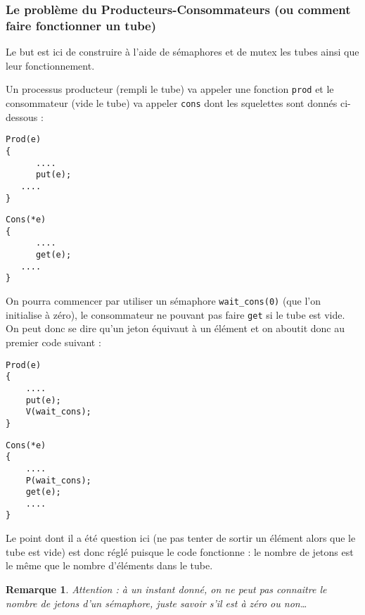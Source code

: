 \documentclass[12pt,a4paper]{report}
\newtheorem*{rem}{Remarque}
\begin{document}
\subsubsection{Le problème du Producteurs-Consommateurs (ou comment faire fonctionner un tube)}
\label{sec:prod-cons}

Le but est ici de construire à l'aide de sémaphores et de mutex les tubes ainsi que leur fonctionnement.

Un processus producteur (rempli le tube) va appeler une fonction \verb?prod? et le consommateur (vide le tube) va appeler \verb?cons? dont les squelettes sont donnés ci-dessous :

\medskip

\begin{minipage}{0.5\linewidth}
\begin{verbatim}
Prod(e)
{
      ....
      put(e);
   ....
}
\end{verbatim}
\end{minipage}
\begin{minipage}{0.5\linewidth}
\begin{verbatim}
Cons(*e)
{
      ....
      get(e);
   ....
}
\end{verbatim}
\end{minipage}

\medskip

On pourra commencer par utiliser un sémaphore \verb?wait_cons(0)? (que l'on initialise à zéro), le consommateur ne pouvant pas faire \verb?get? si le tube est vide. On peut donc se dire qu'un jeton équivaut à un élément et on aboutit donc au  premier code suivant :

\medskip

\begin{minipage}{0.5\linewidth}
\begin{verbatim}
Prod(e)
{
    ....
    put(e);
    V(wait_cons);
}
\end{verbatim}
\end{minipage}
\begin{minipage}{0.5\linewidth}
\begin{verbatim}
Cons(*e)
{
    ....
    P(wait_cons);
    get(e);
    ....
}
\end{verbatim}
\end{minipage}

\medskip

Le point dont il a été question ici (ne pas tenter de sortir un élément alors que le tube est vide) est donc réglé puisque le code fonctionne : le nombre de jetons est le même que le nombre d'éléments dans le tube.
\begin{rem}
  Attention : à un instant donné, on ne peut pas connaitre le nombre de jetons d'un sémaphore, juste savoir s'il est à zéro ou non\dots
\end{rem}
\end{document}
